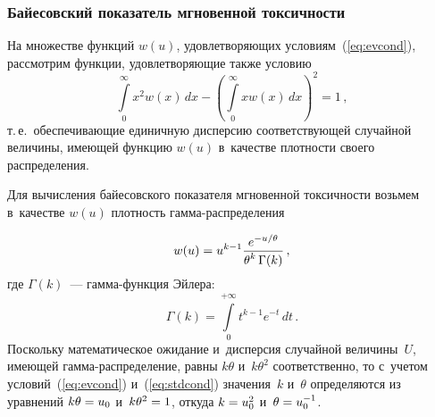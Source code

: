\begin{multicols}{2}
\subsubsection{Байесовский показатель мгновенной токсичности}

На множестве функций $w(u)$, удовле\-тво\-ря\-ющих условиям~(\ref{eq:evcond}),
рассмотрим функции, удовлетво\-ря\-ющие также условию
\begin{equation}
\label{eq:stdcond}
\int\limits_{0}^{\infty}x^2w(x)\,dx - \left(
\int\limits_{0}^{\infty}xw(x)\,dx \right)^2 = 1\,,
\end{equation}
т.\,е.\ обеспечивающие единичную дисперсию соответствующей случайной
величины, имеющей функцию $w(u)$ в~качестве плотности своего
распределения.

Для вычисления байесовского показателя мгновенной токсичности
возьмем в~качестве $w(u)$ плотность гам\-ма-рас\-пре\-де\-ле\-ния

\pagebreak

\noindent
$$
w(u) = u^{k-1} \displaystyle\frac{\displaystyle e^{-u / \theta}\mathstrut}{\displaystyle \theta^k \, \Gamma(k)\mathstrut}\,,
$$
где $\Gamma(k)$~--- гам\-ма-функ\-ция Эйлера:
$$
\Gamma(k) = \int\limits_0^{+\infty} t^{k-1}e^{-t}\,dt\,.
$$
Поскольку математическое ожидание и~дисперсия случайной величины~$U$,
имеющей гам\-ма-рас\-пре\-де\-ле\-ние, равны $k \theta$ и~$k \theta^2$
соответственно, то с~учетом условий~(\ref{eq:evcond}) и~(\ref{eq:stdcond})
значения~$k$ и~$\theta$ определяются из уравнений
$k \theta \hm= u_0$ и~$k \theta^2 \hm= 1$, откуда $k \hm= u_0^2$ и~$\theta \hm=
u_0^{-1}$.

\begin{figure*}[b] %
\vspace*{8pt}
 \begin{center}
 \mbox{%
 \epsfxsize=164.366mm
 }
 \end{center}
 \vspace*{-9pt}
  \label{fig:muhat}
\end{figure*}



\end{multicols}

